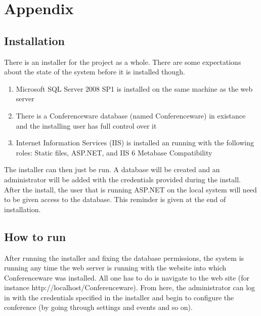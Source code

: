 \documentclass[12pt]{article}
\begin{document}
\section{Appendix}
\subsection{Installation}
There is an installer for the project as a whole. There are some expectations
about the state of the system before it is installed though.
\begin{enumerate}
\item Microsoft SQL Server 2008 SP1 is installed on the same machine as the web
server
\item There is a Conferenceware database (named Conferenceware) in existance and
the installing user has full control over it
\item Internet Information Services (IIS) is installed an running with the
following roles: Static files, ASP.NET, and IIS 6 Metabase Compatibility
\end{enumerate}

The installer can then just be run. A database will be created and an
administrator will be added with the credentials provided during the install.
After the install, the user that is running ASP.NET on the local system will
need to be given access to the database. This reminder is given at the end of
installation.
\subsection{How to run}
After running the installer and fixing the database permissions, the system is
running any time the web server is running with the website into which
Conferenceware was installed. All one has to do is navigate to the web site (for
instance http://localhost/Conferenceware). From here, the administrator can log
in with the credentials specified in the installer and begin to configure the
conference (by going through settings and events and so on).
\end{document}
